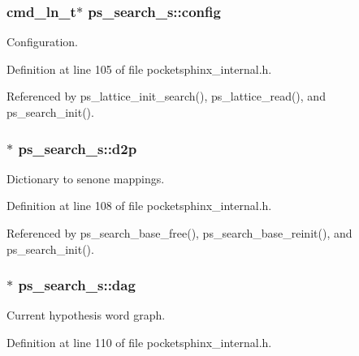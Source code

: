 \subsubsection[{config}]{\setlength{\rightskip}{0pt plus 5cm}cmd\-\_\-ln\-\_\-t$\ast$ ps\-\_\-search\-\_\-s\-::config}\label{structps__search__s_aa6e3e18165bbc70084a06575d5703042}


Configuration. 



Definition at line 105 of file pocketsphinx\-\_\-internal.\-h.



Referenced by ps\-\_\-lattice\-\_\-init\-\_\-search(), ps\-\_\-lattice\-\_\-read(), and ps\-\_\-search\-\_\-init().

\subsubsection[{d2p}]{$\ast$ ps\-\_\-search\-\_\-s\-::d2p}\label{structps__search__s_a81b461e7ef3a080d046039e186134a15}


Dictionary to senone mappings. 



Definition at line 108 of file pocketsphinx\-\_\-internal.\-h.



Referenced by ps\-\_\-search\-\_\-base\-\_\-free(), ps\-\_\-search\-\_\-base\-\_\-reinit(), and ps\-\_\-search\-\_\-init().

\subsubsection[{dag}]{$\ast$ ps\-\_\-search\-\_\-s\-::dag}\label{structps__search__s_a897f46c55d17e817ff1364f555b31463}


Current hypothesis word graph. 



Definition at line 110 of file pocketsphinx\-\_\-internal.\-h.



